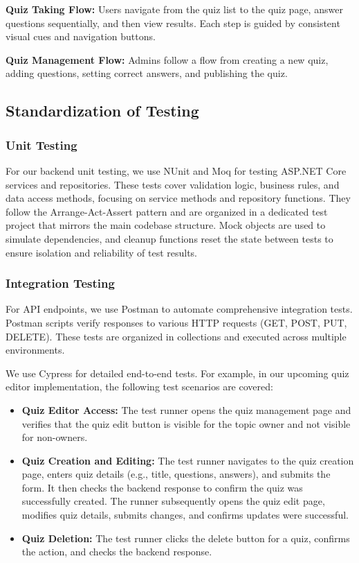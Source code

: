 \documentclass{article}
\begin{document}
  \item \textbf{Quiz Taking Flow:} Users navigate from the quiz list to the quiz page, answer questions sequentially, and then view results. Each step is guided by consistent visual cues and navigation buttons.

  \item \textbf{Quiz Management Flow:} Admins follow a flow from creating a new quiz, adding questions, setting correct answers, and publishing the quiz.

\subsection{Standardization of Testing}

\subsubsection{Unit Testing}
For our backend unit testing, we use NUnit and Moq for testing ASP.NET Core services and repositories. These tests cover validation logic, business rules, and data access methods, focusing on service methods and repository functions. They follow the Arrange-Act-Assert pattern and are organized in a dedicated test project that mirrors the main codebase structure. Mock objects are used to simulate dependencies, and cleanup functions reset the state between tests to ensure isolation and reliability of test results.

\subsubsection{Integration Testing}
For API endpoints, we use Postman to automate comprehensive integration tests. Postman scripts verify responses to various HTTP requests (GET, POST, PUT, DELETE). These tests are organized in collections and executed across multiple environments.

We use Cypress for detailed end-to-end tests. For example, in our upcoming quiz editor implementation, the following test scenarios are covered:

\begin{itemize}
    \item \textbf{Quiz Editor Access:} The test runner opens the quiz management page and verifies that the quiz edit button is visible for the topic owner and not visible for non-owners.
    \item \textbf{Quiz Creation and Editing:} The test runner navigates to the quiz creation page, enters quiz details (e.g., title, questions, answers), and submits the form. It then checks the backend response to confirm the quiz was successfully created. The runner subsequently opens the quiz edit page, modifies quiz details, submits changes, and confirms updates were successful.
    \item \textbf{Quiz Deletion:} The test runner clicks the delete button for a quiz, confirms the action, and checks the backend response.
\end{itemize}
\end{document}
